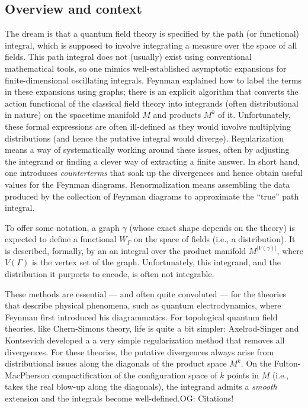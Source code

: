 \documentclass[11pt]{amsart}
\def\owen#1{{\textcolor{violet!50!black}{OG: {#1}}}}
\begin{document}
\subsection{Overview and context}

The dream is that a quantum field theory is specified by the path (or functional) integral,
which is supposed to involve integrating a measure over the space of all fields.
This path integral does not (usually) exist using conventional mathematical tools,
so one mimics well-established asymptotic expansions for finite-dimensional oscillating integrals.
Feynman explained how to label the terms in these expansions using graphs;
there is an explicit algorithm that converts the action functional of the classical field theory into integrands (often distributional in nature) on the spacetime manifold $M$ and products $M^k$ of it.
Unfortunately, these formal expressions are often ill-defined as they would involve multiplying distributions (and hence the putative integral would diverge).
Regularization means a way of systematically working around these issues,
often by adjusting the integrand or finding a clever way of extracting a finite answer.
In short hand, one introduces {\it counterterms} that soak up the divergences and hence obtain useful values for the Feynman diagrams.
Renormalization means assembling the data produced by the collection of Feynman diagrams to approximate the ``true'' path integral.

To offer some notation, a graph $\gamma$ (whose exact shape depends on the theory) is expected to define a functional $W_\Gamma$ on the space of fields (i.e., a distribution).
It is described, formally, by an an integral over the product manifold $M^{|V(\gamma)|}$,  
where $V(\Gamma)$ is the vertex set of the graph.
Unfortunately, this integrand, and the distribution it purports to encode, is often not integrable.

These methods are essential --- and often quite convoluted --- for the theories that describe physical phenomena, 
such as quantum electrodynamics,
where Feynman first introduced his diagrammatics.
For topological quantum field theories, like Chern-Simons theory,
life is quite a bit simpler: Axelrod-Singer and Kontsevich developed a a very simple regularization method that removes all divergences.
For these theories, the putative divergences always arise from distributional issues along the diagonals of the product space $M^k$.
On the Fulton-MacPherson compactification of the configuration space of $k$ points in $M$ (i.e., takes the real blow-up along the diagonals),
the integrand admits a {\em smooth} extension and the integrals become well-defined.\owen{Citations!}
\end{document}
